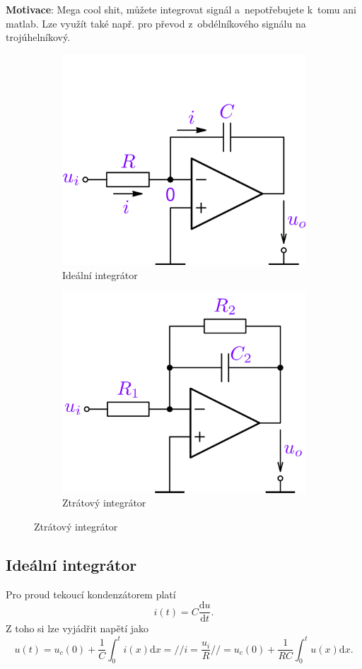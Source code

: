 \documentclass[a4paper,12pt]{article}   %
\begin{document}
\label{chap:integrator}
\textbf{Motivace}: Mega cool shit, můžete integrovat signál a~nepotřebujete k~tomu ani matlab. Lze využít také např. pro převod z~obdélníkového signálu na trojúhelníkový. 

\begin{figure}[h!]
    \centering
    \begin{subfigure}{.49\textwidth}
        \centering
        \includegraphics[height=.5\linewidth]{integrator-ideal.PNG}
        \caption{Ideální integrátor}
        \label{sch:integrator:ideal}
    \end{subfigure}
    \begin{subfigure}{.49\textwidth}
        \centering
        \includegraphics[height=.5\linewidth]{integrator-real.PNG}
        \caption{Ztrátový integrátor}
        \label{sch:integrator:ztatovy}
    \end{subfigure}
\end{figure}

\subsection*{Ideální integrátor}
Pro proud tekoucí kondenzátorem platí
\begin{equation*}
    i(t) = C\frac{\text{d}u}{\text{d}t}.
\end{equation*}
Z toho si lze vyjádřit napětí jako
\begin{equation*}
    u(t) = u_c(0) + \frac{1}{C}\int_0^t i(x)\text{d}x =//i=\frac{u_i}{R}//= u_c(0) + \frac{1}{RC}\int_0^t u(x)\text{d}x.
\end{equation*}
\end{document}
